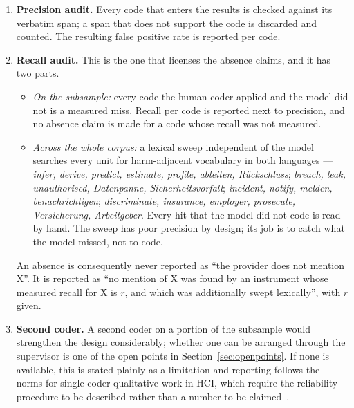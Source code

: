 \begin{enumerate}[leftmargin=*,itemsep=3pt]
        subsample drawn. Codes that cannot be brought above the threshold after
        two revisions, and whose low $\kappa$ is not explained by prevalence,
        are reported as unreliable and excluded from quantitative claims, with
        the reason stated.
  \item \textbf{Precision audit.} Every code that enters the results is checked
        against its verbatim span; a span that does not support the code is
        discarded and counted. The resulting false positive rate is reported per
        code.
  \item \textbf{Recall audit.} This is the one that licenses the absence claims,
        and it has two parts.
        \begin{itemize}[leftmargin=1.2em,topsep=3pt,itemsep=2pt]
          \item \emph{On the subsample:} every code the human coder applied and
                the model did not is a measured miss. Recall per code is
                reported next to precision, and no absence claim is made for a
                code whose recall was not measured.
          \item \emph{Across the whole corpus:} a lexical sweep independent of
                the model searches every unit for harm-adjacent vocabulary in
                both languages --- \emph{infer, derive, predict, estimate,
                profile, ableiten, Rückschluss}; \emph{breach, leak,
                unauthorised, Datenpanne, Sicherheitsvorfall}; \emph{incident,
                notify, melden, benachrichtigen}; \emph{discriminate, insurance,
                employer, prosecute, Versicherung, Arbeitgeber}. Every hit that
                the model did not code is read by hand. The sweep has poor
                precision by design; its job is to catch what the model missed,
                not to code.
        \end{itemize}
        An absence is consequently never reported as \enquote{the provider does
        not mention X}. It is reported as \enquote{no mention of X was found by
        an instrument whose measured recall for X is $r$, and which was
        additionally swept lexically}, with $r$ given.
  \item \textbf{Second coder.} A second coder on a portion of the subsample
        would strengthen the design considerably; whether one can be arranged
        through the supervisor is one of the open points in
        Section~\ref{sec:openpoints}. If none is available, this is stated
        plainly as a limitation and reporting follows the norms for
        single-coder qualitative work in HCI, which require the reliability
        procedure to be described rather than a number to be
        claimed~\parencite{mcdonald2019reliability}.
\end{enumerate}

